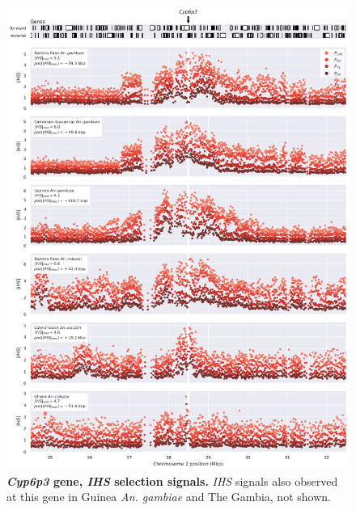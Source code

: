 \documentclass[a4paper,11pt,abstracton,hidelinks]{scrartcl}
\begin{document}
\begin{figure}[t!]
	\begin{center}
		\includegraphics*[width=1.1\linewidth,center]{artwork/locus_cyp6p3_ihs.png}
	\end{center}
	\caption[\textit{Cyp6p3} gene, \textit{IHS} selection signals]{
	\textbf{\textit{Cyp6p3} gene, \textit{IHS} selection signals.}
	\textit{IHS} signals also observed at this gene in Guinea \textit{An. gambiae} and The Gambia, not shown. 
	} 
	\label{fig:locus_cyp6p3_ihs}
\end{figure}


\clearpage
\end{document}

